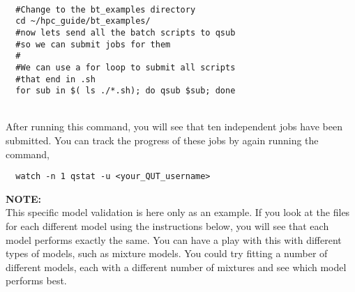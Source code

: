 \\
\par
\begin{verbatim}
  #Change to the bt_examples directory
  cd ~/hpc_guide/bt_examples/
  #now lets send all the batch scripts to qsub
  #so we can submit jobs for them
  #
  #We can use a for loop to submit all scripts
  #that end in .sh
  for sub in $( ls ./*.sh); do qsub $sub; done
\end{verbatim}
% 
\\
% 
After running this command, you will see that ten independent jobs have been submitted. You can track the progress of these jobs by again running the command,
\\
\par
\begin{verbatim}
  watch -n 1 qstat -u <your_QUT_username>
\end{verbatim}
%
%
\begin{story}
  \textbf{NOTE:}
  \\
  This specific model validation is here only as an example. If you look at the  files for each different model using the instructions below, you will see that each model performs exactly the same. You can have a play with this with different types of models, such as mixture models. You could try fitting a number of different models, each with a different number of mixtures and see which model performs best.
\end{story}

